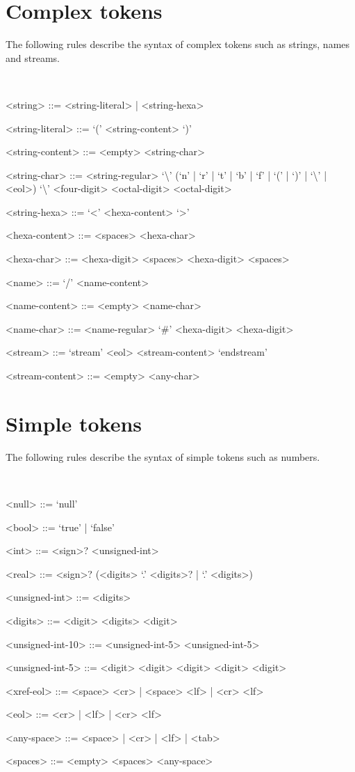 \section{Complex tokens}
\label{gram:tokens}

The following rules describe the syntax of complex tokens such as strings, names and streams.

~

\begin{grammar}
<string> ::= <string-literal> | <string-hexa>

<string-literal> ::= `(' <string-content> `)'

<string-content> ::= <empty>
 <string-char>

<string-char> ::= <string-regular>
\alt `\textbackslash' (`n' | `r' | `t' | `b' | `f' | `(' | `)' | `\textbackslash' | <eol>)
\alt `\textbackslash' <four-digit> <octal-digit> <octal-digit>

<string-hexa> ::= `<' <hexa-content> `>'

<hexa-content> ::= <spaces>
 <hexa-char>

<hexa-char> ::= <hexa-digit> <spaces> <hexa-digit> <spaces>

<name> ::= `/' <name-content>

<name-content> ::= <empty>
 <name-char>

<name-char> ::= <name-regular>
\alt `#' <hexa-digit> <hexa-digit>

<stream> ::= `stream' <eol> <stream-content> `endstream'

<stream-content> ::= <empty>
 <any-char>
\end{grammar}

\section{Simple tokens}

The following rules describe the syntax of simple tokens such as numbers.

~

\begin{grammar}
<null> ::= `null'

<bool> ::= `true' | `false'

<int> ::= <sign>? <unsigned-int>

<real> ::= <sign>? (<digits> `.' <digits>? | `.' <digits>)

<unsigned-int> ::= <digits>

<digits> ::= <digit>
\alt <digits> <digit>

<unsigned-int-10> ::= <unsigned-int-5> <unsigned-int-5>

<unsigned-int-5> ::= <digit> <digit> <digit> <digit> <digit>

<xref-eol> ::= <space> <cr> | <space> <lf> | <cr> <lf>

<eol> ::= <cr> | <lf> | <cr> <lf>

<any-space> ::= <space> | <cr> | <lf> | <tab>

<spaces> ::= <empty>
\alt <spaces> <any-space>
\end{grammar}


